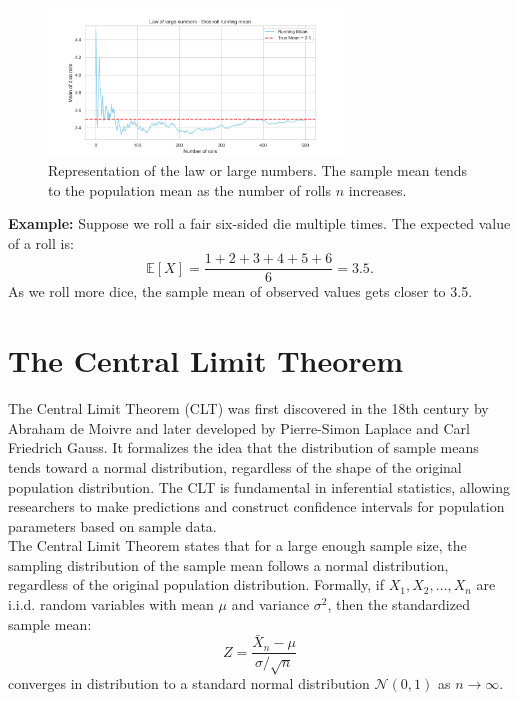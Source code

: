\documentclass{book}
\begin{document}
\begin{figure}[ht]
    \centering
    \includegraphics[width=0.7\textwidth]{figures/chapter3/law_large_numbers.png}
    \caption{Representation of the law or large numbers. The sample mean tends to the population mean as the number of rolls $n$ increases.}
    \label{fig:random}
\end{figure}

\textbf{Example:} Suppose we roll a fair six-sided die multiple times. The expected value of a roll is:
\begin{equation}
    \mathbb{E}[X] = \frac{1+2+3+4+5+6}{6} = 3.5.
\end{equation}
As we roll more dice, the sample mean of observed values gets closer to 3.5.

\newpage

\section{The Central Limit Theorem}

The Central Limit Theorem (CLT) was first discovered in the 18th century by Abraham de Moivre and later developed by Pierre-Simon Laplace and Carl Friedrich Gauss. It formalizes the idea that the distribution of sample means tends toward a normal distribution, regardless of the shape of the original population distribution. The CLT is fundamental in inferential statistics, allowing researchers to make predictions and construct confidence intervals for population parameters based on sample data.\\

The Central Limit Theorem states that for a large enough sample size, the sampling distribution of the sample mean follows a normal distribution, regardless of the original population distribution. Formally, if $X_1, X_2, \dots, X_n$ are i.i.d. random variables with mean $\mu$ and variance $\sigma^2$, then the standardized sample mean:
\begin{equation}
    Z = \frac{\bar{X}_n - \mu}{\sigma / \sqrt{n}}
\end{equation}
converges in distribution to a standard normal distribution $\mathcal{N}(0,1)$ as $n \to \infty$.
\end{document}
